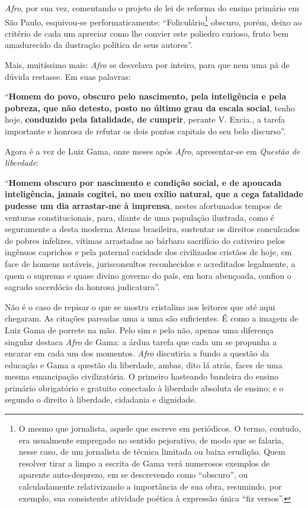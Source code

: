 \emph{Afro}, por sua vez, comentando o projeto de lei de reforma do
ensino primário em São Paulo, esquivou-se performaticamente:
``Foliculário\footnote{O mesmo que jornalista, aquele que escreve em
  periódicos. O termo, contudo, era usualmente empregado no sentido
  pejorativo, de modo que se falaria, nesse caso, de um jornalista de
  técnica limitada ou baixa erudição. Quem resolver tirar a limpo a
  escrita de Gama verá numerosos exemplos de aparente auto-desprezo, em
  se descrevendo como ``obscuro'', ou calculadamente relativizando a
  importância de sua obra, resumindo, por exemplo, sua consistente
  atividade poética à expressão única ``fiz versos''.} obscuro, porém,
deixo ao critério de cada um apreciar como lhe convier este poliedro
curioso, fruto bem amadurecido da ilustração política de seus autores''.

Mais, muitíssimo mais: \emph{Afro} se desvelava por inteiro, para que
nem uma pá de dúvida restasse. Em suas palavras:

``\textbf{Homem do povo, obscuro pelo nascimento, pela inteligência e
pela pobreza, que não detesto, posto no último grau da escala social},
tenho hoje, \textbf{conduzido pela fatalidade, de cumprir}, perante V.
Excia., a tarefa importante e honrosa de refutar os dois pontos capitais
do seu belo discurso''.

Agora é a vez de Luiz Gama, onze meses após \emph{Afro}, apresentar-se
em \emph{Questão de liberdade}:

``\textbf{Homem obscuro por nascimento e condição social, e de apoucada
inteligência, jamais cogitei, no meu exílio natural, que a cega
fatalidade pudesse um dia arrastar-me à imprensa}, nestes afortunados
tempos de venturas constitucionais, para, diante de uma população
ilustrada, como é seguramente a desta moderna Atenas brasileira,
sustentar os direitos conculcados de pobres infelizes, vítimas
arrastadas ao bárbaro sacrifício do cativeiro pelos ingênuos caprichos e
pela paternal caridade dos civilizados cristãos de hoje, em face de
homens notáveis, jurisconsultos reconhecidos e acreditados legalmente, a
quem o supremo e quase divino governo do país, em hora abençoada,
confiou o sagrado sacerdócio da honrosa judicatura''.

Não é o caso de repisar o que se mostra cristalino aos leitores que até
aqui chegaram. As citações pareadas uma a uma são suficientes. É como a
imagem de Luiz Gama de porrete na mão. Pelo sim e pelo não, apenas uma
diferença singular destaca \emph{Afro} de Gama: a árdua tarefa que cada
um se propunha a encarar em cada um dos momentos. \emph{Afro} discutiria
a fundo a questão da educação e Gama a questão da liberdade, ambas, dito
lá atrás, faces de uma mesma emancipação civilizatória. O primeiro
hasteando bandeira do ensino primário obrigatório e gratuito conectado à
liberdade absoluta de ensino; e o segundo o direito à liberdade,
cidadania e dignidade.

